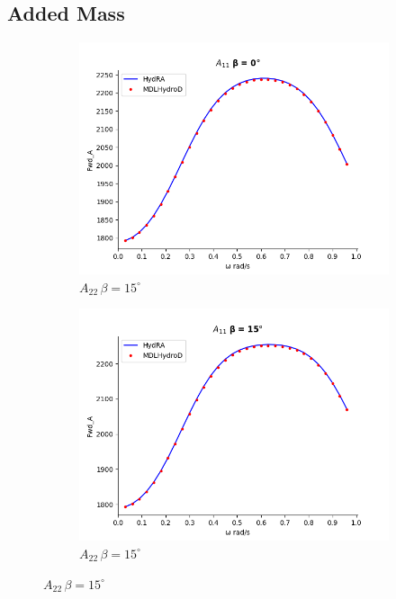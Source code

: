 \subsection{Added Mass}
\begin{figure}[H]
    \centering
    \begin{subfigure}[b]{0.45\textwidth}
        \includegraphics[width=\textwidth]{plots/kcs/added_mass/A11_BETA_0.png}
        \caption{$A_{22} \, \beta = 15^{\circ}$}
    \end{subfigure}
    \begin{subfigure}[b]{0.45\textwidth}
        \includegraphics[width=\textwidth]{plots/kcs/added_mass/A11_BETA_15.png}
        \caption{$A_{22} \, \beta = 15^{\circ}$}

\end{subfigure}
\end{figure}
